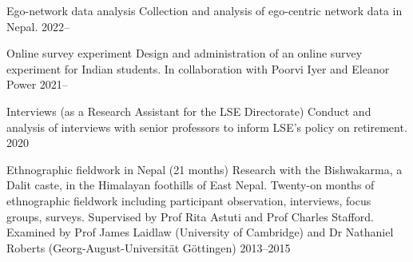 
\begin{cvexperiences}

  \cvexperience
    {Ego-network data analysis} %
    {Collection and analysis of ego-centric network data in Nepal.} %
    {2022--} %

  \cvexperience
    {Online survey experiment} %
    {Design and administration of an online survey experiment for Indian students. In collaboration with Poorvi Iyer and Eleanor Power} %
    {2021--} %

  \cvexperience
    {Interviews (as a Research Assistant for the LSE Directorate)} %
    {Conduct and analysis of interviews with senior professors to inform LSE's policy on retirement.} %
    {2020} %


  \cvexperience
    {Ethnographic fieldwork in Nepal (21 months)} %
    {Research with the Bishwakarma, a Dalit caste, in the Himalayan foothills of East Nepal. Twenty-on months of ethnographic fieldwork including participant observation, interviews, focus groups, surveys. Supervised by Prof Rita Astuti and Prof Charles Stafford. Examined by Prof James Laidlaw (University of Cambridge) and Dr Nathaniel Roberts (Georg-August-Universität Göttingen)} %
    {2013--2015} %

\end{cvexperiences}
